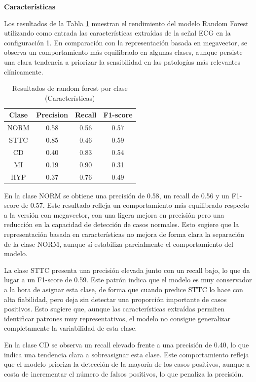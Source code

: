 \documentclass[12pt,a4paper,twoside]{book}
\begin{document}
\textbf{Características}

Los resultados de la Tabla \ref{tab:metrics_clase_rf_feat} muestran el rendimiento del modelo Random Forest utilizando como entrada las características extraídas de la señal ECG en la configuración 1. 
En comparación con la representación basada en megavector, se observa un comportamiento más equilibrado en algunas clases, aunque persiste una clara tendencia a priorizar la sensibilidad en las patologías más relevantes clínicamente.

\begin{table}[H]
	\centering
	\begin{tabular}{|c|c|c|c|}
	\hline
	\textbf{Clase} & \textbf{Precision} & \textbf{Recall} & \textbf{F1-score} \\
	\hline
	NORM & 0.58 & 0.56 & 0.57 \\
	STTC & 0.85 & 0.46 & 0.59 \\
	CD   & 0.40 & 0.83 & 0.54 \\
	MI   & 0.19 & 0.90 & 0.31 \\
	HYP  & 0.37 & 0.76 & 0.49 \\
	\hline
	\end{tabular}
	\caption{Resultados de random forest por clase (Características)}
	\label{tab:metrics_clase_rf_feat}
\end{table}

En la clase NORM se obtiene una precisión de 0.58, un recall de 0.56 y un F1-score de 0.57. 
Este resultado refleja un comportamiento más equilibrado respecto a la versión con megavector, con una ligera mejora en precisión pero una reducción en la capacidad de detección de casos normales. 
Esto sugiere que la representación basada en características no mejora de forma clara la separación de la clase NORM, aunque sí estabiliza parcialmente el comportamiento del modelo.

La clase STTC presenta una precisión elevada junto con un recall bajo, lo que da lugar a un F1-score de 0.59. 
Este patrón indica que el modelo es muy conservador a la hora de asignar esta clase, de forma que cuando predice STTC lo hace con alta fiabilidad, pero deja sin detectar una proporción importante de casos positivos. 
Esto sugiere que, aunque las características extraídas permiten identificar patrones muy representativos, el modelo no consigue generalizar completamente la variabilidad de esta clase.

En la clase CD se observa un recall elevado frente a una precisión de 0.40, lo que indica una tendencia clara a sobreasignar esta clase. 
Este comportamiento refleja que el modelo prioriza la detección de la mayoría de los casos positivos, aunque a costa de incrementar el número de falsos positivos, lo que penaliza la precisión.
\end{document}
